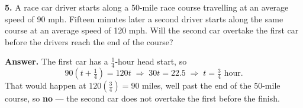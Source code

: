 \documentclass{ximera}
\begin{document}
\begin{problem}
\textbf{5.} A race car driver starts along a 50-mile race course travelling at an average
speed of 90 mph. Fifteen minutes later a second driver starts along the same course at an
average speed of 120 mph. Will the second car overtake the first car before the drivers
reach the end of the course?

\begin{hint}
\textbf{Answer.} The first car has a $\tfrac{1}{4}$-hour head start, so
\[
  90\left(t+\tfrac{1}{4}\right)=120t \;\Longrightarrow\; 30t=22.5
  \;\Longrightarrow\; t=\tfrac{3}{4}\text{ hour}.
\]
That would happen at $120\left(\tfrac{3}{4}\right)=90$ miles, well past the end of the
50-mile course, so \textbf{no} --- the second car does not overtake the first before the
finish.
\end{hint}
\end{problem}
\end{document}
